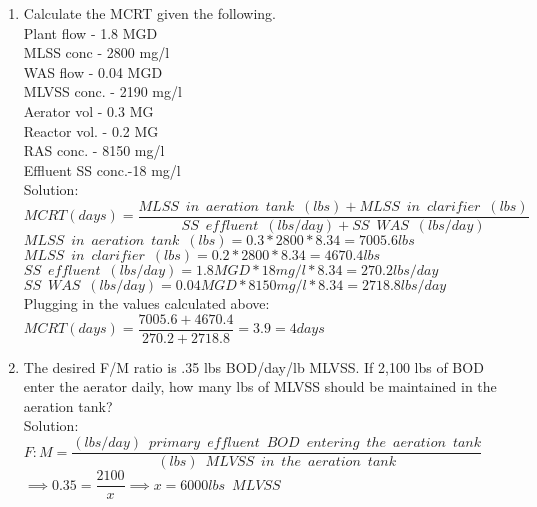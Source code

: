 \begin{enumerate}
\item Calculate the MCRT given the following.\\
Plant flow - 1.8 MGD\\
MLSS conc -  2800 mg/l\\
WAS flow - 0.04 MGD\\
MLVSS conc. - 2190 mg/l\\
Aerator vol - 0.3 MG\\
Reactor vol. - 0.2 MG\\
RAS conc. - 8150 mg/l\\
Effluent SS conc.-18 mg/l\\
Solution:\\
\vspace{0.2cm}
$MCRT (days) =  \dfrac{MLSS \enspace in \enspace aeration \enspace tank \enspace (lbs)+MLSS \enspace in \enspace clarifier \enspace (lbs)}{SS \enspace effluent \enspace (lbs/day)+SS \enspace WAS \enspace (lbs/day)}$\\
\vspace{0.3cm} 
$MLSS \enspace in \enspace aeration \enspace tank \enspace (lbs)=0.3*2800*8.34=7005.6lbs$\\
\vspace{0.3cm} 
$MLSS \enspace in \enspace clarifier \enspace (lbs)=0.2*2800*8.34=4670.4lbs$\\
\vspace{0.3cm} 
$SS \enspace effluent \enspace (lbs/day)=1.8MGD *18mg/l*8.34=270.2lbs/day$\\
\vspace{0.3cm} 
$SS \enspace WAS \enspace (lbs/day)=0.04MGD *8150mg/l*8.34=2718.8lbs/day$\\
\vspace{0.3cm} 
Plugging in the values calculated above: $MCRT (days) =  \dfrac{7005.6+4670.4}{270.2+2718.8}=3.9=\boxed{4days}$\\
\vspace{0.2cm}

\item The desired F/M ratio is .35 lbs BOD/day/lb MLVSS. If 2,100 lbs of BOD enter the aerator daily, how many lbs of MLVSS should be maintained in the aeration tank?\\
Solution:\\
$F:M=\dfrac{(lbs/day) \enspace primary \enspace effluent  \enspace BOD \enspace entering \enspace the  \enspace aeration \enspace tank}{(lbs) \enspace MLVSS \enspace in \enspace the  \enspace aeration \enspace tank}$\\
\vspace{0.3cm}
$\implies 0.35=\dfrac{2100}{x}\implies x = \boxed{6000lbs \enspace MLVSS}$\\


\end{enumerate}
